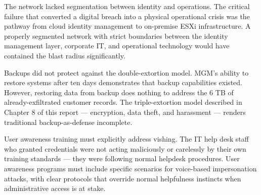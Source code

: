 The network lacked segmentation between identity and operations. The critical failure that converted a digital breach into a physical operational crisis was the pathway from cloud identity management to on-premise ESXi infrastructure. A properly segmented network with strict boundaries between the identity management layer, corporate IT, and operational technology would have contained the blast radius significantly.

Backups did not protect against the double-extortion model. MGM's ability to restore systems after ten days demonstrates that backup capabilities existed. However, restoring data from backup does nothing to address the 6 TB of already-exfiltrated customer records. The triple-extortion model described in Chapter 8 of this report — encryption, data theft, and harassment — renders traditional backup-as-defense incomplete.

User awareness training must explicitly address vishing. The IT help desk staff who granted credentials were not acting maliciously or carelessly by their own training standards — they were following normal helpdesk procedures. User awareness programs must include specific scenarios for voice-based impersonation attacks, with clear protocols that override normal helpfulness instincts when administrative access is at stake.